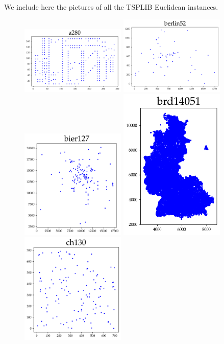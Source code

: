 \begin{appendices}
We include here the pictures of all the TSPLIB Euclidean instances. 

\begin{figure}[H]
\centering
\includegraphics[width=5cm]{../tsplib_euc2d_pictures_of_instances/a280.png}
\includegraphics[width=5cm]{../tsplib_euc2d_pictures_of_instances/berlin52.png}
\includegraphics[width=5cm]{../tsplib_euc2d_pictures_of_instances/bier127.png}
\includegraphics[width=5cm]{../tsplib_euc2d_pictures_of_instances/brd14051.png}
\includegraphics[width=5cm]{../tsplib_euc2d_pictures_of_instances/ch130.png}

\end{figure}
\end{appendices}
